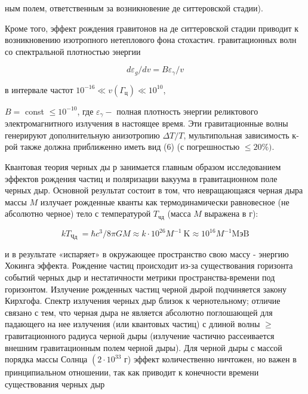 \documentclass[10pt]{article}
\begin{document}
ным полем, ответственным за возникновение де ситтеровской стадии).



Кроме того, эффект рождения гравитонов на де ситтеровской стадии приводит к возникновению изотропного нетеплового фона стохастич. гравитационных волн со спектральной плотностью энергии



\[

d \varepsilon_{g} / d v=B \varepsilon_{\gamma} / v

\]



в интервале частот $10^{-16} \ll v\left(\Gamma_{ц}\right) \ll 10^{10}$,



$B=$ const $\leqslant 10^{-10}$, где $\varepsilon_{\gamma}-$ полная плотность энергии реликтового электромагнитного излучения в настоящее время. Эти гравитационные волны генерируют дополнительную анизотропию $\Delta T / T$, мультипольная зависимость к-рой также должна приближенно иметь вид (6) (с погрешностью $\leqslant 20 \%)$.



Квантовая теория черных ды р занимается главным образом исследованием эффектов рождения частиц и поляризации вакуума в гравитационном поле черных дыр. Основной результат состоит в том, что невращающаяся черная дыра массы $M$ излучает рожденные кванты как термодинамически равновесное (не абсолютно черное) тело с температурой $T_{ч д}$ (масса $M$ выражена в г):



\[

k T_{\text {Чд }}=\hbar c^{3} / 8 \pi G M \approx k \cdot 10^{26} M^{-1} \mathrm{~K} \approx 10^{16} M^{-1} \mathrm{MэB}

\]



и в результате «испаряет» в окружающее пространство свою массу - энергию Хокинга эффекта. Рождение частиц происходит из-за существования горизонта событий черных дыр и нестатичности метрики пространства-времени под горизонтом. Излучение рожденных частиц черной дырой подчиняется закону Кирхгофа. Спектр излучения черных дыр близок к чернотельному; отличие связано с тем, что черная дыра не является абсолютно поглошающей для падающего на нее излучения (или квантовых частиц) с длиной волны $\geqslant$ гравитационного радиуса черной дыры (излучение частично рассеивается внешним гравитационным полем черной дыры). Для черной дыры с массой порядка массы Солнца $\left(2 \cdot 10^{33}\right.$ г) эффект количественно ничтожен, но важен в принципиальном отношении, так как приводит к конечности времени существования черных дыр
\end{document}
